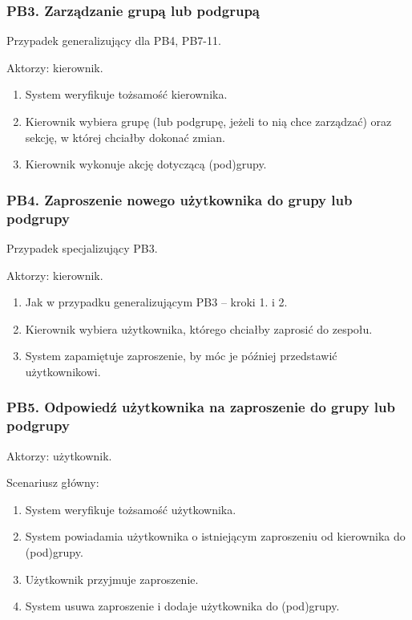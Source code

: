 \documentclass[11pt,a4paper]{article}
\renewcommand{\_}{\char`_}
\begin{document}
\subsubsection{PB3. Zarządzanie grupą lub podgrupą}

Przypadek generalizujący dla PB4, PB7-11.

Aktorzy: kierownik.
\begin{enumerate}
    \item System weryfikuje tożsamość kierownika.
    \item Kierownik wybiera grupę (lub podgrupę, jeżeli to nią chce zarządzać) oraz sekcję, w której chciałby dokonać zmian.
    \item Kierownik wykonuje akcję dotyczącą (pod)grupy.
\end{enumerate}

\subsubsection{PB4. Zaproszenie nowego użytkownika do grupy lub podgrupy}

Przypadek specjalizujący PB3.

Aktorzy: kierownik.
\begin{enumerate}
    \item Jak w przypadku generalizującym PB3 – kroki 1. i 2.
    \item Kierownik wybiera użytkownika, którego chciałby zaprosić do zespołu.
    \item System zapamiętuje zaproszenie, by móc je później przedstawić użytkownikowi.
\end{enumerate}

\subsubsection{PB5. Odpowiedź użytkownika na zaproszenie do grupy lub podgrupy}

Aktorzy: użytkownik.

Scenariusz główny:
\begin{enumerate}
    \item System weryfikuje tożsamość użytkownika.
    \item System powiadamia użytkownika o istniejącym zaproszeniu od kierownika do (pod)grupy.
    \item Użytkownik przyjmuje zaproszenie.
    \item System usuwa zaproszenie i dodaje użytkownika do (pod)grupy.
\end{enumerate}
\end{document}
